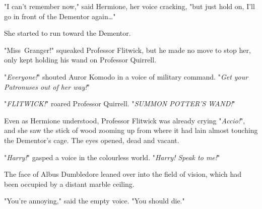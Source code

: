 "I can't remember now," said Hermione, her voice cracking, "but just hold on,
I'll go in front of the Dementor again…"

She started to run toward the Dementor.

"Miss~Granger!" squeaked Professor Flitwick, but he made no move to stop her,
only kept holding his wand on Professor Quirrell.

"\emph{Everyone!}" shouted Auror Komodo in a voice of military command.
"\emph{Get your Patronuses out of her way!}"

"\emph{FLITWICK!}" roared Professor Quirrell. "\emph{SUMMON POTTER'S WAND!}"

Even as Hermione understood, Professor Flitwick was already crying
"\emph{Accio!}", and she saw the stick of wood zooming up from where it had
lain almost touching the Dementor's cage.
\later
The eyes opened, dead and vacant.

"\emph{Harry!}" gasped a voice in the colourless world. "\emph{Harry! Speak to
me!}"

The face of Albus Dumbledore leaned over into the field of vision, which had
been occupied by a distant marble ceiling.

"You're annoying," said the empty voice. "You should die."
